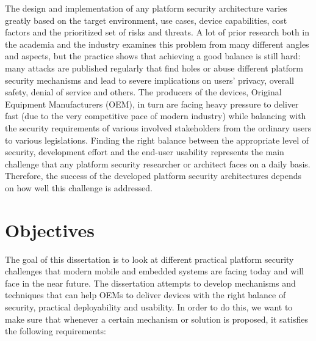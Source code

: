 The design and implementation of any platform security architecture varies greatly based on the target environment, use cases, device capabilities, cost factors and the prioritized set of risks and threats. A lot of prior research both in the academia and the industry examines this problem from many different angles and aspects, but the practice shows that achieving a good balance is still hard: many attacks are published regularly that find holes or abuse different platform security mechanisms and lead to severe implications on users' privacy, overall safety, denial of service and others. The producers of the devices, Original Equipment Manufacturers (OEM), in turn are facing heavy pressure to deliver fast (due to the very competitive pace of modern industry) while balancing with the security requirements of various involved stakeholders from the ordinary users to various legislations. Finding the right balance between the appropriate level of security, development effort and the end-user usability represents the main challenge that any platform security researcher or architect faces on a daily basis. Therefore, the success of the developed platform security architectures depends on how well this challenge is addressed.   

\section{Objectives}
\label{sec:Objectives}

The goal of this dissertation is to look at different practical platform security challenges that modern mobile and embedded systems are facing today and will face in the near future. The dissertation attempts to develop mechanisms and techniques that can help OEMs to deliver devices with the right balance of security, practical deployability and usability. In order to do this, we want to make sure that whenever a certain mechanism or solution is proposed, it satisfies the following requirements:


